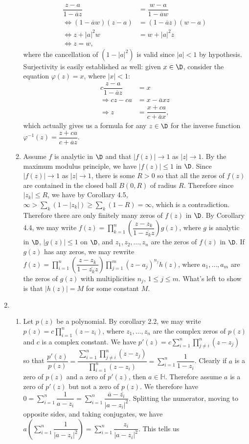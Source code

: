 \documentclass[11pt]{book}
\theoremstyle{definition}
\renewcommand{\H}{\mathbb{H}}
\begin{document}
\begin{enumerate}
\begin{enumerate}
\begin{align*}
\dfrac{z-a}{1-\overline{a}z} &= \dfrac{w-a}{1-\overline{a}w} \\
\Leftrightarrow (1-\overline{a}w)(z-a) &= (1-\overline{a}z)(w-a) \\
\Leftrightarrow z+|a|^2w &= w + |a|^2z \\
\Leftrightarrow z = w,
\end{align*}
where the cancellation of $(1-|a|^2)$ is valid since $|a|<1$ by hypothesis. Surjectivity is easily established as well: given $x\in\D$, consider the equation $\varphi(z)=x$, where $|x|<1$:
\begin{align*}
c\dfrac{z-a}{1-\overline{a}z}&=x \\
\Rightarrow cz-ca&=x-\overline{a}xz \\
\Rightarrow z&=\dfrac{x+ca}{c+\overline{a}x},
\end{align*}
which actually gives us a formula for any $z\in \D$ for the inverse function $\varphi^{-1}(z)=\dfrac{z+ca}{c+\overline{a}z}$.
\item Assume $f$ is analytic in $\D$ and that $|f(z)|\to 1$ as $|z|\to 1$. By the maximum modulus principle, we have $|f(z)|\leq 1$ in $\D$. Since $|f(z)|\to 1$ as $|z|\to 1$, there is some $R>0$ so that all the zeros of $f(z)$ are contained in the closed ball $B(0,R)$ of radius $R$. Therefore since $|z_k|\leq R$, we have by Corollary 4.5, $\infty > \sum_k (1-|z_k|) \geq \sum_k (1-R) = \infty$, which is a contradiction. Therefore there are only finitely many zeros of $f(z)$ in $\D$. By Corollary 4.4, we may write $f(z)=\prod_{k=1}^n \left(\dfrac{z-z_k}{1-\overline{z_k}z}\right)g(z)$, where $g$ is analytic in $\D$, $|g(z)|\leq 1$ on $\D$, and $z_1,z_2,\dotsc,z_n$ are the zeros of $f(z)$ in $\D$. If $g(z)$ has any zeros, we may rewrite $f(z)=\prod_{i=1}^n \left(\dfrac{z-z_k}{1-\overline{z_k}z}\right)\prod_{j=1}^m (z-a_j)^{n_j}h(z)$, where $a_1,\dotsc,a_m$ are the zeros of $g(z)$ with multiplicities $n_j$, $1\leq j\leq m$. What's left to show is that $|h(z)|=M$ for some constant $M$. 
\end{enumerate} 
%
%
\item
\begin{enumerate}
\item Let $p(z)$ be a polynomial. By corollary 2.2, we may write $p(z)=c\displaystyle\prod_{i=1}^n (z-z_i)$, where $z_1,\dotsc,z_n$ are the complex zeros of $p(z)$ and $c$ is a complex constant. We have $p'(z)=c\displaystyle\sum_{i=1}^n\prod_{j\neq i}^n (z-z_j)$ so that $\dfrac{p'(z)}{p(z)}=\displaystyle\dfrac{\sum_{i=1}^n\prod_{j\neq i}^n (z-z_j)}{\prod_{i=1}^n (z-z_i)}=\sum_{i=1}^n\dfrac{1}{1-z_i}$. Clearly if $a$ is a zero of $p(z)$ and a zero of $p'(z)$, then $a\in \H$. Therefore assume $a$ is a zero of $p'(z)$ but not a zero of $p(z)$. We therefore have $0=\displaystyle\sum_{i=1}^n \dfrac{1}{a-z_i}=\sum_{i=1}^n \dfrac{\overline{a}-\overline{z_i}}{|a-z_i|^2}$. Splitting the numerator, moving to opposite sides, and taking conjugates, we have $a\left(\sum_{i=1}^n \dfrac{1}{|a-z_i|^2}\right) = \sum_{i=1}^n\dfrac{z_i}{|a-z_i|^2}$. This tells us

\end{enumerate}
\end{enumerate}
\end{document}
